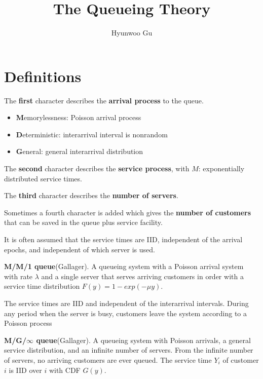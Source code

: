 \documentclass[12pt]{article}
\theoremstyle{nonumberbreak}
\begin{document}
\title{\textbf{The Queueing Theory}}
\author{Hyunwoo Gu}
\date{}

\maketitle


\section{Definitions}

The \textbf{first} character describes the \textbf{arrival process} to the queue.

\begin{itemize}
	\item \textbf{M}emorylessness: Poisson arrival process\item \textbf{D}eterministic: interarrival interval is nonrandom
	\item \textbf{G}eneral: general interarrival distribution
\end{itemize}

The \textbf{second} character describes the \textbf{service process}, with $M$: exponentially distributed service times. 

The \textbf{third} character describes the \textbf{number of servers}.  

Sometimes a fourth character is added which gives the \textbf{number of customers} that can be saved in the queue plus service facility. 

It is often assumed that the service times are IID, independent of the arrival epochs, and independent of which server is used. 


\textbf{M/M/1 queue}(Gallager). A queueing system with a Poisson arrival system with rate $\lambda$ and a single server that serves arriving customers in order with a service time distribution $F(y) = 1 - exp(-\mu y)$. 

The service times are IID and independent of the interarrival intervals. During any period when the server is busy, customers leave the system according to a Poisson process



\textbf{M/G/$\infty$ queue}(Gallager). A queueing system with Poisson arrivals, a general service distribution, and an infinite number of servers. From the infinite number of servers, no arriving customers are ever queued. The service time $Y_i$ of customer $i$ is IID over $i$ with CDF $G(y)$. 
\end{document}
